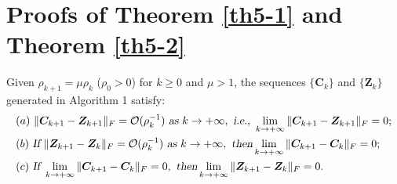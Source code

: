 \section{Proofs of Theorem \ref{th5-1} and Theorem \ref{th5-2}}
\begin{theorem}
Given $\rho_{k+1}=\mu\rho_{k}$ ($\rho_{0}>0$) for $k\ge0$ and $\mu>1$, the sequences $\{\bm{C}_{k}\}$ and $\{\bm{Z}_{k}\}$ generated in Algorithm 1 satisfy:
\begin{align}
&
(a)\ 
\|\bm{C}_{k+1}-\bm{Z}_{k+1}\|_{F}=\mathcal{O}(\rho_{k}^{-1})
\ 
\textsl{as}\ k \to +\infty
,\ 
\textsl{i.e.},\ 
\lim_{k \to +\infty} \|\bm{C}_{k+1}-\bm{Z}_{k+1}\|_{F}=0;
\\
&
(b)\ 
\textsl{If}\ 
\|\bm{Z}_{k+1}-\bm{Z}_{k}\|_{F}=\mathcal{O}(\rho_{k}^{-1})
\ 
\textsl{as}\ k \to +\infty
,\ 
\textsl{then} 
\lim_{k \to +\infty} \|\bm{C}_{k+1}-\bm{C}_{k}\|_{F}=0;
\\
&
(c)\ 
\textsl{If}\ 
\lim_{k \to +\infty} \|\bm{C}_{k+1}-\bm{C}_{k}\|_{F}=0,\ 
\textsl{then} 
\lim_{k \to +\infty} \|\bm{Z}_{k+1}-\bm{Z}_{k}\|_{F}=0.
\end{align}
\end{theorem}


